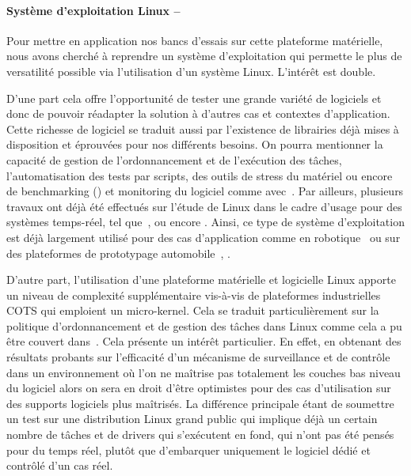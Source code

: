 \documentclass[french, a4paper, 11pt, twoside, pdftex]{StyleThese}
\begin{document}
        \paragraph{Système d'exploitation Linux --}
        Pour mettre en application nos bancs d'essais sur cette plateforme matérielle, nous avons cherché à reprendre un système d'exploitation qui permette le plus de versatilité possible via l'utilisation d'un système Linux. L'intérêt est double. 
        
        D'une part cela offre l'opportunité de tester une grande variété de logiciels et donc de pouvoir réadapter la solution à d'autres cas et contextes d'application. Cette richesse de logiciel se traduit aussi par l'existence de librairies déjà mises à disposition et éprouvées pour nos différents besoins. On pourra mentionner la capacité de gestion de l'ordonnancement et de l'exécution des tâches, l'automatisation des tests par scripts, des outils de stress du matériel ou encore de benchmarking (\cite{king_stress-ng_2019}) et monitoring du logiciel comme avec~\cite{girbal_metrics_2018}. Par ailleurs, plusieurs travaux ont déjà été effectués sur l'étude de Linux dans le cadre d'usage pour des systèmes temps-réel, tel que~\cite{litayem_building_2011}, \cite{allende_towards_2019} ou encore \cite{serra_architecture_2020}. Ainsi, ce type de système d'exploitation est déjà largement utilisé pour des cas d'application comme en robotique~\cite{bouchier_embedded_2013} ou sur des plateformes de prototypage automobile~\cite{sivakumar_automotive_2020}, \cite{gobillot_esprit_2018}.
        
        D'autre part, l'utilisation d'une plateforme matérielle et logicielle Linux apporte un niveau de complexité supplémentaire vis-à-vis de plateformes industrielles COTS qui emploient un micro-kernel. Cela se traduit particulièrement sur la politique d'ordonnancement et de gestion des tâches dans Linux comme cela a pu être couvert dans~\cite{lozi_linux_2016}. Cela présente un intérêt particulier. En effet, en obtenant des résultats probants sur l'efficacité d'un mécanisme de surveillance et de contrôle dans un environnement où l'on ne maîtrise pas totalement les couches bas niveau du logiciel alors on sera en droit d'être optimistes pour des cas d'utilisation sur des supports logiciels plus maîtrisés. La différence principale étant de soumettre un test sur une distribution Linux grand public qui implique déjà un certain nombre de tâches et de drivers qui s'exécutent en fond, qui n'ont pas été pensés pour du temps réel, plutôt que d'embarquer uniquement le logiciel dédié et contrôlé d'un cas réel.
        
\end{document}
